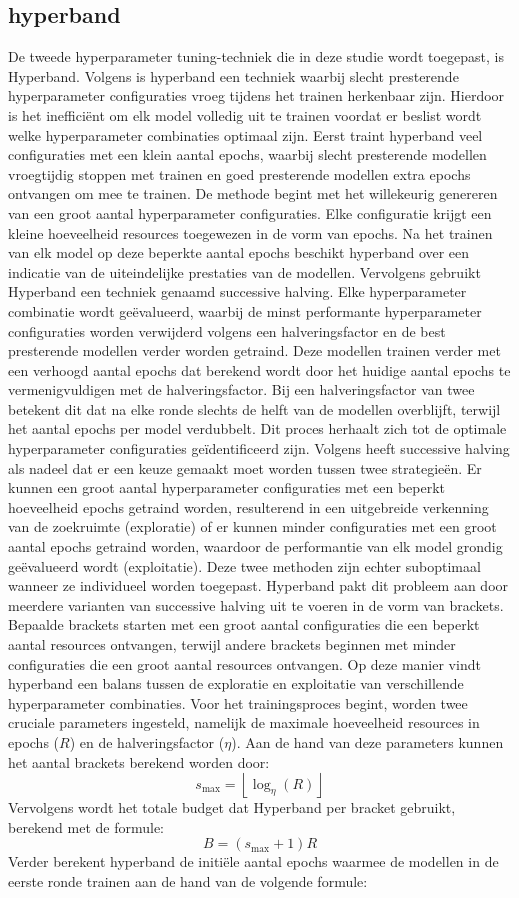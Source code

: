 \subsection{hyperband}
De tweede hyperparameter tuning-techniek die in deze studie wordt toegepast, is Hyperband. Volgens \textcite{Li2016} is hyperband een techniek waarbij slecht presterende hyperparameter configuraties vroeg tijdens het trainen herkenbaar zijn. Hierdoor is het inefficiënt om elk model volledig uit te trainen voordat er beslist wordt welke hyperparameter combinaties optimaal zijn. Eerst traint hyperband veel configuraties met een klein aantal epochs, waarbij slecht presterende modellen vroegtijdig stoppen met trainen en goed presterende modellen extra epochs ontvangen om mee te trainen. De methode begint met het willekeurig genereren van een groot aantal hyperparameter configuraties. Elke configuratie krijgt een kleine hoeveelheid resources toegewezen in de vorm van epochs. 
Na het trainen van elk model op deze beperkte aantal epochs beschikt hyperband over een indicatie van de uiteindelijke prestaties van de modellen. Vervolgens gebruikt Hyperband een techniek genaamd successive halving. Elke hyperparameter combinatie wordt geëvalueerd, waarbij de minst performante hyperparameter configuraties worden verwijderd volgens een halveringsfactor en de best presterende modellen verder worden getraind. Deze modellen trainen verder met een verhoogd aantal epochs dat berekend wordt door het huidige aantal epochs te vermenigvuldigen met de halveringsfactor. Bij een halveringsfactor van twee betekent dit dat na elke ronde slechts de helft van de modellen overblijft, terwijl het aantal epochs per model verdubbelt. Dit proces herhaalt zich tot de optimale hyperparameter configuraties geïdentificeerd zijn.
Volgens \textcite{Li2016} heeft successive halving als nadeel dat er een keuze gemaakt moet worden tussen twee strategieën. Er kunnen een groot aantal hyperparameter configuraties met een beperkt hoeveelheid epochs getraind worden, resulterend in een uitgebreide verkenning van de zoekruimte (exploratie) of er kunnen minder configuraties met een groot aantal epochs getraind worden, waardoor de performantie van elk model grondig geëvalueerd wordt (exploitatie). Deze twee methoden zijn echter suboptimaal wanneer ze individueel worden toegepast. Hyperband pakt dit probleem aan door meerdere varianten van successive halving uit te voeren in de vorm van brackets. Bepaalde brackets starten met een groot aantal configuraties die een beperkt aantal resources ontvangen, terwijl andere brackets beginnen met minder configuraties die een groot aantal resources ontvangen. Op deze manier vindt hyperband een balans tussen de exploratie en exploitatie van verschillende hyperparameter combinaties.
Voor het trainingsproces begint, worden twee cruciale parameters ingesteld, namelijk de maximale hoeveelheid resources in epochs ($R$) en de halveringsfactor ($\eta$). Aan de hand van deze parameters kunnen het aantal brackets berekend worden door:
\[ s_{\max}=\left\lfloor\log_{\eta}(R)\right\rfloor \]
Vervolgens wordt het totale budget dat Hyperband per bracket gebruikt, berekend met de formule:
\[ B=(s_{\max}+1)R \]
Verder berekent hyperband de initiële aantal epochs waarmee de modellen in de eerste ronde trainen aan de hand van de volgende formule:

